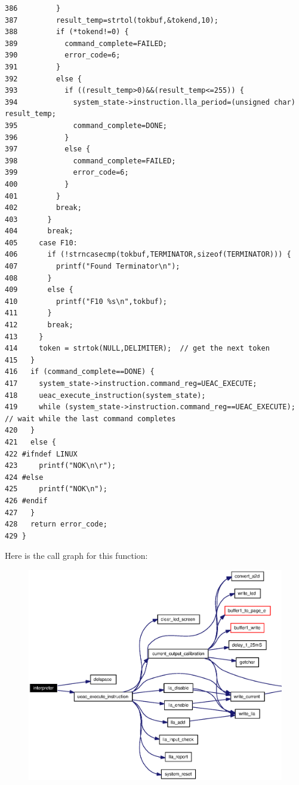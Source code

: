 \begin{verbatim}
386         }
387         result_temp=strtol(tokbuf,&tokend,10);
388         if (*tokend!=0) {
389           command_complete=FAILED;
390           error_code=6;
391         }
392         else {
393           if ((result_temp>0)&&(result_temp<=255)) {
394             system_state->instruction.lla_period=(unsigned char) result_temp;
395             command_complete=DONE;
396           }
397           else {
398             command_complete=FAILED;
399             error_code=6;
400           }
401         }
402         break;
403       }
404       break;
405     case F10:
406       if (!strncasecmp(tokbuf,TERMINATOR,sizeof(TERMINATOR))) {
407         printf("Found Terminator\n");
408       }
409       else {
410         printf("F10 %s\n",tokbuf);
411       }
412       break;
413     }
414     token = strtok(NULL,DELIMITER);  // get the next token 
415   }
416   if (command_complete==DONE) {
417     system_state->instruction.command_reg=UEAC_EXECUTE;
418     ueac_execute_instruction(system_state);
419     while (system_state->instruction.command_reg==UEAC_EXECUTE); // wait while the last command completes
420   }
421   else {
422 #ifndef LINUX 
423     printf("NOK\n\r");
424 #else
425     printf("NOK\n");
426 #endif 
427   }
428   return error_code;
429 }
\end{verbatim}\normalsize 




Here is the call graph for this function:\begin{figure}[H]
\begin{center}
\leavevmode
\includegraphics[width=333pt]{interpreter_8c_a9_cgraph}
\end{center}
\end{figure}


